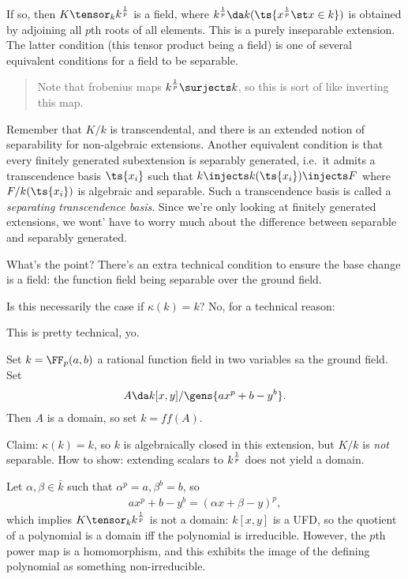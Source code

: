 If so, then \(K\tensor_k k^{1\over p}\) is a field, where
\(k^{1\over p} \da k(\ts{x^{1\over p} \st x\in k })\) is obtained by
adjoining all \(p\)th roots of all elements. This is a purely
inseparable extension. The latter condition (this tensor product being a
field) is one of several equivalent conditions for a field to be
separable.

\begin{quote}
Note that frobenius maps \(k^{1\over p} \surjects k\), so this is sort
of like inverting this map.
\end{quote}

Remember that \(K/k\) is transcendental, and there is an extended notion
of separability for non-algebraic extensions. Another equivalent
condition is that every finitely generated subextension is separably
generated, i.e.~it admits a transcendence basis \(\ts{x_i}\) such that
\(k\injects k(\ts{x_i}) \injects F\) where \(F/k(\ts{x_i})\) is
algebraic and separable. Such a transcendence basis is called a
\emph{separating transcendence basis}. Since we're only looking at
finitely generated extensions, we wont' have to worry much about the
difference between separable and separably generated.

What's the point? There's an extra technical condition to ensure the
base change is a field: the function field being separable over the
ground field.

Is this necessarily the case if \(\kappa(k) = k\)? No, for a technical
reason:

\begin{warning}

This is pretty technical, yo.

\end{warning}

\begin{example}

\label{technical_example} Set \(k = \FF_p(a, b)\) a rational function
field in two variables sa the ground field. Set
\begin{align*}  
A \da k[x, y]/ \gens{ax^p + b-y^b}
.\end{align*} Then \(A\) is a domain, so set \(k = ff(A)\).

Claim: \(\kappa(k) = k\), so \(k\) is algebraically closed in this
extension, but \(K/k\) is \emph{not} separable. How to show: extending
scalars to \(k^{1\over p}\) does not yield a domain.

Let \(\alpha, \beta \in \bar k\) such that
\(\alpha^p = a, \beta^b = b\), so
\begin{align*}  
ax^p + b-y^b = (\alpha x + \beta - y)^p
,\end{align*} which implies \(K \tensor_k k^{1\over p}\) is not a
domain: \(k[x, y]\) is a UFD, so the quotient of a polynomial is a
domain iff the polynomial is irreducible. However, the \(p\)th power map
is a homomorphism, and this exhibits the image of the defining
polynomial as something non-irreducible.

\end{example}

